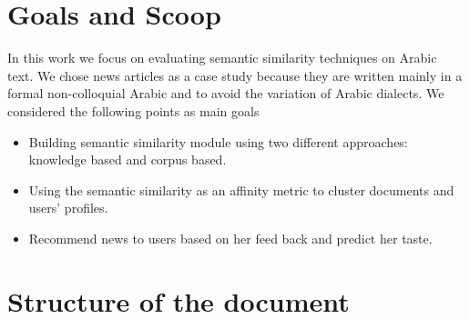 \section{Goals and Scoop}\label{subsec:goals}
In this work we focus on evaluating semantic similarity techniques on Arabic text. We chose news articles as a case study because they are written mainly in a formal non-colloquial Arabic and to avoid the variation of Arabic dialects.
We considered the following points as main goals
\begin {itemize}
\item Building semantic similarity module using two different approaches: knowledge based and corpus based.
\item Using the semantic similarity as an affinity metric to cluster documents and users' profiles.
\item Recommend news to users based on her feed back and predict her taste.
\end{itemize}

\section{Structure of the document}\label{subsec:struct}



